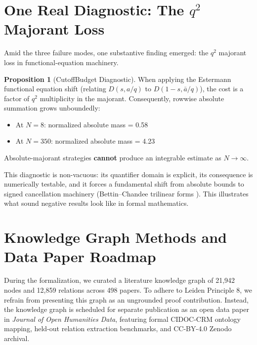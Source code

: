 \documentclass[11pt,a4paper]{article}
\theoremstyle{definition}
\newtheorem{proposition}{Proposition}
\theoremstyle{remark}
\begin{document}
\section{One Real Diagnostic: The $q^2$ Majorant Loss}
\label{sec:diagnostic}

Amid the three failure modes, one substantive finding emerged: the $q^2$ majorant loss in functional-equation machinery.

\begin{proposition}[CutoffBudget Diagnostic]
When applying the Estermann functional equation shift (relating $D(s, a/q)$ to $D(1-s, \bar{a}/q)$), the cost is a factor of $q^2$ multiplicity in the majorant. Consequently, rowwise absolute summation grows unboundedly:
\begin{itemize}[leftmargin=2em]
  \item At $N = 8$: normalized absolute mass = 0.58
  \item At $N = 350$: normalized absolute mass = 4.23
\end{itemize}
Absolute-majorant strategies \textbf{cannot} produce an integrable estimate as $N \to \infty$.
\end{proposition}

This diagnostic is non-vacuous: its quantifier domain is explicit, its consequence is numerically testable, and it forces a fundamental shift from absolute bounds to signed cancellation machinery (Bettin--Chandee trilinear forms \cite{BettinChandee2015}). This illustrates what sound negative results look like in formal mathematics.

\section{Knowledge Graph Methods and Data Paper Roadmap}
\label{sec:kg}

During the formalization, we curated a literature knowledge graph of 21,942 nodes and 12,859 relations across 498 papers. To adhere to Leiden Principle 8, we refrain from presenting this graph as an ungrounded proof contribution. Instead, the knowledge graph is scheduled for separate publication as an open data paper in \textit{Journal of Open Humanities Data}, featuring formal CIDOC-CRM ontology mapping, held-out relation extraction benchmarks, and CC-BY-4.0 Zenodo archival.
\end{document}
